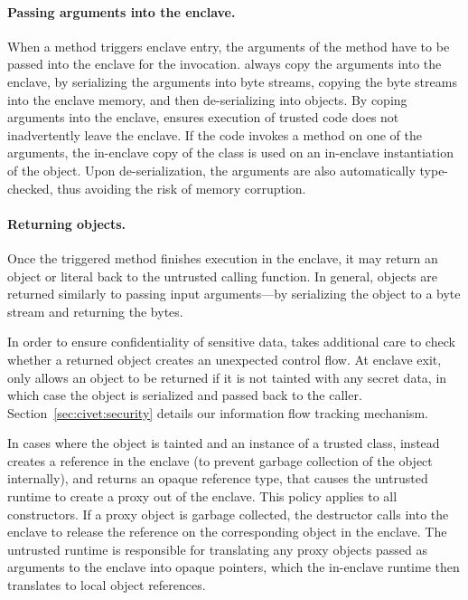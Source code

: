 \paragraph{Passing arguments into the enclave.}
When a method triggers enclave entry, the arguments of the method have to be passed into the enclave for the invocation.
\sysname{} always copy the arguments into the enclave,
by serializing the arguments into byte streams,
copying the byte streams into the enclave memory,
and then de-serializing into objects.
By coping arguments into the enclave,
\sysname{} ensures execution of trusted code does not inadvertently leave the enclave.
If the code invokes a method on one of the arguments,
the in-enclave copy of the class is used on an in-enclave instantiation of the object.
Upon de-serialization, the arguments are also automatically type-checked,
thus avoiding the risk of memory corruption.

\paragraph{Returning objects.}
Once the triggered method finishes execution in the enclave,
it may return an object or literal back to the untrusted calling function.
In general, objects are returned similarly to passing input arguments---by serializing the object to a byte stream and returning the bytes.

In order to ensure confidentiality of sensitive data, \sysname{} takes additional care to check
whether a returned object creates an unexpected control flow.
At enclave exit, \sysname{} only allows an object to be returned if it is not tainted with any secret data,
in which case the object is serialized and passed back to the caller.
Section~\ref{sec:civet:security} details our information flow tracking mechanism.

In cases where the object is tainted and an instance of a trusted class,
\sysname{} instead creates a reference in the enclave (to prevent garbage collection of the object internally),
and returns an opaque reference type, that causes the untrusted \sysname{} runtime to create a proxy out of the enclave.
This policy applies to all constructors.
If a proxy object is garbage collected, the destructor calls into the enclave to release the reference on the 
corresponding object in the enclave.
The \sysname{} untrusted runtime is responsible for translating any proxy objects passed as arguments to the enclave into opaque pointers,
which the in-enclave runtime then translates to local object references.

